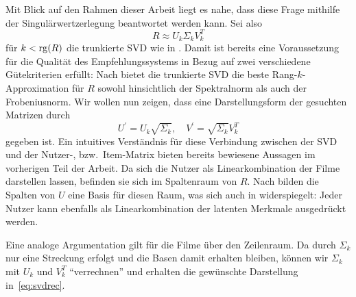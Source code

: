 Mit Blick auf den Rahmen dieser Arbeit liegt es nahe, dass diese Frage mithilfe der Singulärwertzerlegung beantwortet werden kann.
Sei also 
\begin{equation*}
    R \approx U_{k} \Sigma_{k} V_{k}^{T}
\end{equation*}
für \(k < \operatorname{rg}(R)\) die trunkierte SVD wie in .
Damit ist bereits eine Voraussetzung für die Qualität des Empfehlungssystems in Bezug auf zwei verschiedene Gütekriterien erfüllt:
Nach  bietet die trunkierte SVD die beste Rang-\(k\)-Approximation für \(R\) sowohl hinsichtlich der Spektralnorm als auch der Frobeniusnorm.
Wir wollen nun zeigen, dass eine Darstellungsform der gesuchten Matrizen durch
\begin{equation}
    U^{'} = U_{k} \sqrt{\Sigma_{k}}, \quad V^{'} = \sqrt{\Sigma_{k}}V^{T}_{k} \label{eq:svdrec}
\end{equation}
gegeben ist.
Ein intuitives Verständnis für diese Verbindung zwischen der SVD und der Nutzer-, bzw.\ Item-Matrix bieten bereits bewiesene Aussagen im vorherigen Teil der Arbeit.
Da sich die Nutzer als Linearkombination der Filme darstellen lassen, befinden sie sich im Spaltenraum von \(R\). 
Nach  bilden die Spalten von \(U\) eine Basis für diesen Raum, was sich auch in  widerspiegelt:
Jeder Nutzer kann ebenfalls als Linearkombination der latenten Merkmale ausgedrückt werden.

Eine analoge Argumentation gilt für die Filme über den Zeilenraum.
Da durch \(\Sigma_{k}\) nur eine Streckung erfolgt und die Basen damit erhalten bleiben, können wir \(\Sigma_{k}\) mit \(U_{k}\) und \(V_{k}^{T}\) \enquote{verrechnen} und erhalten die gewünschte Darstellung in~\eqref{eq:svdrec}.



